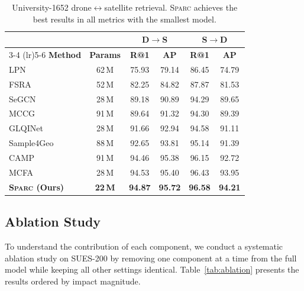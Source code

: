 \documentclass[sigconf, anonymous, review]{acmart}
\newcommand{\ours}{\textsc{Sparc}}
\begin{document}
\begin{table}[t]
\caption{University-1652 drone$\leftrightarrow$satellite retrieval. \ours{} achieves the best results in all metrics with the smallest model.}
\label{tab:u1652}
\centering
\small
\begin{tabular}{@{}lccccc@{}}
\toprule
& & \multicolumn{2}{c}{\textbf{D${\to}$S}} & \multicolumn{2}{c}{\textbf{S${\to}$D}} \\
\cmidrule(lr){3-4} \cmidrule(lr){5-6}
\textbf{Method} & \textbf{Params} & \textbf{R@1} & \textbf{AP} & \textbf{R@1} & \textbf{AP} \\
\midrule
LPN & 62\,M & 75.93 & 79.14 & 86.45 & 74.79 \\
FSRA & 52\,M & 82.25 & 84.82 & 87.87 & 81.53 \\
SeGCN & 28\,M & 89.18 & 90.89 & 94.29 & 89.65 \\
MCCG & 91\,M & 89.64 & 91.32 & 94.30 & 89.39 \\
GLQINet & 28\,M & 91.66 & 92.94 & 94.58 & 91.11 \\
Sample4Geo & 88\,M & 92.65 & 93.81 & 95.14 & 91.39 \\
CAMP & 91\,M & 94.46 & 95.38 & 96.15 & 92.72 \\
MCFA & 28\,M & 94.53 & 95.40 & 96.43 & 93.95 \\
\midrule
\rowcolor{bestrow}
\textbf{\ours{} (Ours)} & \textbf{22\,M} & \textbf{94.87} & \textbf{95.72} & \textbf{96.58} & \textbf{94.21} \\
\bottomrule
\end{tabular}
\end{table}

\subsection{Ablation Study}
\label{sec:ablation}

To understand the contribution of each component, we conduct a systematic ablation study on SUES-200 by removing one component at a time from the full model while keeping all other settings identical.
Table~\ref{tab:ablation} presents the results ordered by impact magnitude.
\end{document}
